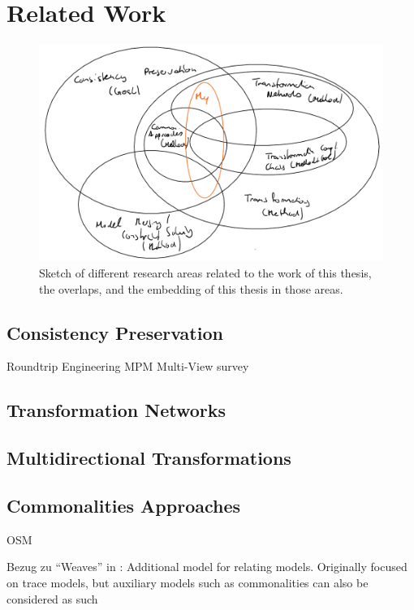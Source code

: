 \chapter{Related Work
}
\label{chap:relatedwork}

\begin{figure}
    \centering
    \includegraphics[width=\textwidth]{figures/epilogue/relatedwork/research_areas.png}
    \caption[Overlaps of related research areas]{Sketch of different research areas related to the work of this thesis, the overlaps, and the embedding of this thesis in those areas.}
    \label{fig:relatedwork:areas}
\end{figure}

\section{Consistency Preservation}
Roundtrip Engineering
MPM
Multi-View survey ~\cite{cicchetti2019multiview-SoSym}

\section{Transformation Networks}

\section{Multidirectional Transformations}

\section{Commonalities Approaches}
OSM

Bezug zu \enquote{Weaves} in \cite{kolovos2008a}: Additional model for relating models. Originally focused on trace models, but auxiliary models such as commonalities can also be considered as such

